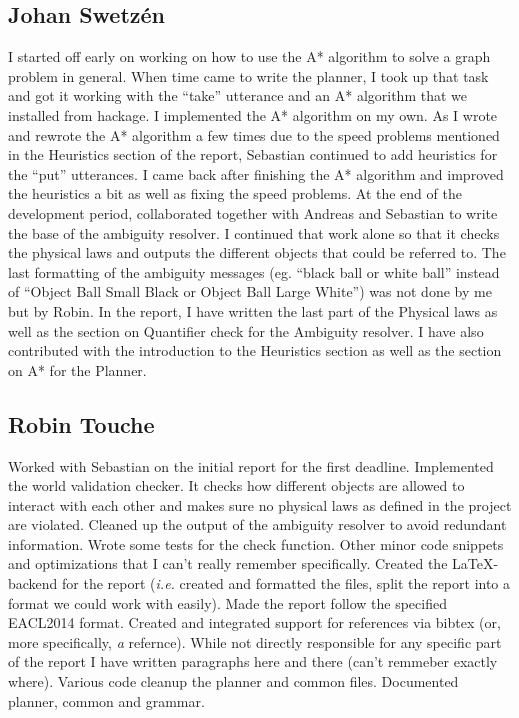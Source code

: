 \subsection*{Johan Swetz\'en}
I started off early on working on how to use the A* algorithm to solve a graph problem in general.
When time came to write the planner, I took up that task and got it working with the ``take'' utterance and an A* algorithm that we installed from hackage.
\newline
\newline
I implemented the A* algorithm on my own.
As I wrote and rewrote the A* algorithm a few times due to the speed problems mentioned in the Heuristics section of the report, Sebastian continued to add heuristics for the ``put'' utterances. I came back after finishing the A* algorithm and improved the heuristics a bit as well as fixing the speed problems.
\newline
\newline
At the end of the development period, collaborated together with Andreas and Sebastian to write the base of the ambiguity resolver.
I continued that work alone so that it checks the physical laws and outputs the different objects that could be referred to.
The last formatting of the ambiguity messages (eg. ``black ball or white ball'' instead of ``Object Ball Small Black or Object Ball Large White'') was not done by me but by Robin.
\newline
\newline
In the report, I have written the last part of the Physical laws as well as the section on Quantifier check for the Ambiguity resolver.
I have also contributed with the introduction to the Heuristics section as well as the section on A* for the Planner.

\newpage
\subsection*{Robin Touche}
Worked with Sebastian on the initial report for the first deadline.
\newline
\newline
Implemented the world validation checker.
It checks how different objects are allowed to interact with each other and makes sure no physical laws as defined in the project are violated.
Cleaned up the output of the ambiguity resolver to avoid redundant information.
Wrote some tests for the check function.
Other minor code snippets and optimizations that I can't really remember specifically.
\newline
\newline
Created the \LaTeX-backend for the report (\emph{i.e.} created and formatted the files, split the report into a format we could work with easily).
Made the report follow the specified EACL2014 format.
Created and integrated support for references via bibtex (or, more specifically, \emph{a} refernce).
While not directly responsible for any specific part of the report I have written paragraphs here and there (can't remmeber exactly where).
\newline
\newline
Various code cleanup the planner and common files.
Documented planner, common and grammar.
